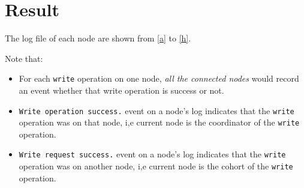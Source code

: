 \documentclass[12pt,letterpaper,en-US]{article}
\begin{document}
\pagebreak
\section{Result}

The log file of each node are shown from \cref{a} to \cref{h}.









Note that:
\begin{itemize}
\item For each \texttt{write} operation on one node, \emph{all the connected nodes} would record an event whether that write operation is success or not.
\item \texttt{Write operation success.} event on a node's log indicates that the \texttt{write} operation was on that node, i,e current node is the coordinator of the \texttt{write} operation.
\item \texttt{Write request success.} event on a node's log indicates that the \texttt{write} operation was on another node, i,e current node is the cohort of the \texttt{write} operation.

\end{itemize}
\end{document}

